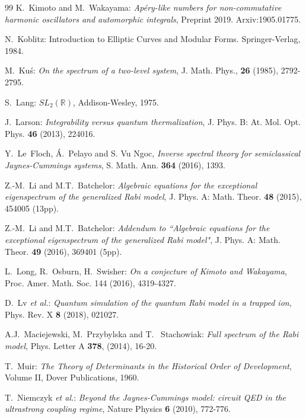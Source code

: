 \documentclass[11pt]{article}
\numberwithin{equation}{section}
\theoremstyle{plain}
\theoremstyle{definition}
\theoremstyle{remark}
\begin{document}
\begin{thebibliography}{99}
  K.~Kimoto and M.~Wakayama:
  \textit{Apéry-like numbers for non-commutative harmonic oscillators and automorphic integrals},
  Preprint 2019. Arxiv:1905.01775.
  
  N.~Koblitz:
  Introduction to Elliptic Curves and Modular Forms.
  Springer-Verlag, 1984.

  M.~Ku\'s:
  \textit{On the spectrum of a two-level system}, J. Math. Phys., \textbf{26} (1985), 2792-2795.

  S.~Lang:
  $SL_2(\mathbb R)$, Addison-Wesley,  1975.

  J.~Larson:
  \textit{Integrability versus quantum thermalization},
  J. Phys. B: At. Mol. Opt. Phys. \textbf{46}  (2013), 224016.

  Y.~Le~Floch, Á.~Pelayo and S. Vu Ngoc,
  \textit{Inverse spectral theory for semiclassical Jaynes-Cummings systems},
  S. Math. Ann. \textbf{364} (2016), 1393.

  Z.-M.~Li and M.T.~Batchelor:
  \textit{Algebraic equations for the exceptional eigenspectrum of the generalized Rabi model},
  J. Phys. A: Math. Theor. \textbf{48} (2015), 454005 (13pp).

  Z.-M.~Li and M.T.~Batchelor:
  \textit{Addendum to ``Algebraic equations for the exceptional eigenspectrum of the generalized Rabi model"},
  J. Phys. A: Math. Theor. \textbf{49} (2016), 369401 (5pp).

L.~Long, R.~Osburn, H.~Swisher: 
\textit{On a conjecture of Kimoto and Wakayama}, Proc. Amer. Math. Soc. 144 (2016), 4319-4327.
   
  D.~Lv {\it et al.}:
  \textit{Quantum simulation of the quantum Rabi model in a trapped ion},
  Phys. Rev. X \textbf{8} (2018), 021027.

  A.J.~Maciejewski, M.~Przybylska and T. ~Stachowiak:
  \textit{Full spectrum of the Rabi model}, Phys. Letter A \textbf{378}, (2014), 16-20.

  T.~Muir:
  \textit{The Theory of Determinants in the Historical Order of Development}, Volume II,
  Dover Publications, 1960.

  T.~Niemczyk {\it et al.}:
  \textit{Beyond the Jaynes-Cummings model: circuit QED in the ultrastrong coupling regime},
  Nature Physics \textbf{6} (2010), 772-776.


\end{thebibliography}
\end{document}
